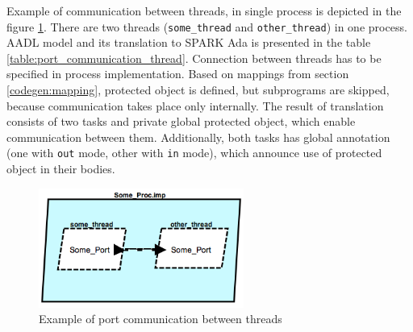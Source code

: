 Example of communication between threads, in single process is depicted in the figure \ref{figure:port_communication_thread}. There are two threads (\lstinline{some_thread} and \lstinline{other_thread}) in one process. AADL model and its translation to SPARK Ada is presented in the table \ref{table:port_communication_thread}. Connection between threads has to be specified in process implementation. Based on mappings from section \ref{codegen:mapping}, protected object is defined, but subprograms are skipped, because communication takes place only internally. The result of translation consists of two tasks and private global protected object, which enable communication between them. Additionally, both tasks has global annotation (one with \lstinline{out} mode, other with \lstinline{in} mode), which announce use of protected object in their bodies.

\begin{figure}[ht]%
    \begin{center}
    	\includegraphics[width=0.6\textwidth]{figures/port-communication-thread.png}
    	\caption{Example of port communication between threads}
    \end{center}
    \label{figure:port_communication_thread}
\end{figure}

